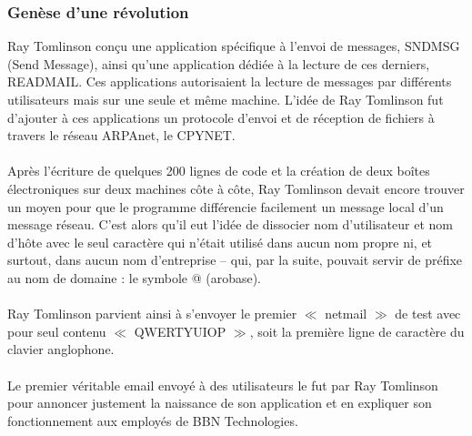 \documentclass[french]{report}
\begin{document}
\begin{titlepage}
\subsubsection{\LARGE Genèse d’une révolution}
\LARGE Ray Tomlinson conçu une application spécifique à l’envoi de messages, SNDMSG (Send Message), ainsi qu’une application dédiée à la lecture de ces derniers, READMAIL. Ces applications autorisaient la lecture de messages par différents utilisateurs mais sur une seule et même machine. L’idée de Ray Tomlinson fut d’ajouter à ces applications un protocole d’envoi et de réception de fichiers à travers le réseau ARPAnet, le CPYNET.\\ \\
Après l’écriture de quelques 200 lignes de code et la création de deux boîtes électroniques sur deux machines côte à côte, Ray Tomlinson devait encore trouver un moyen pour que le programme différencie facilement un message local d’un message réseau. C’est alors qu’il eut l’idée de dissocier nom d’utilisateur et nom d’hôte avec le seul caractère qui n’était utilisé dans aucun nom propre ni, et surtout, dans aucun nom d’entreprise – qui, par la suite, pouvait servir de préfixe au nom de domaine : le symbole @ (arobase).\\ \\
Ray Tomlinson parvient ainsi à s’envoyer le premier $\ll$ netmail $\gg$ de test avec pour seul contenu $\ll$ QWERTYUIOP $\gg$, soit la première ligne de caractère du clavier anglophone.\\ \\
Le premier véritable email envoyé à des utilisateurs le fut par Ray Tomlinson pour annoncer justement la naissance de son application et en expliquer son fonctionnement aux employés de BBN Technologies.

\end{titlepage}
\end{document}
